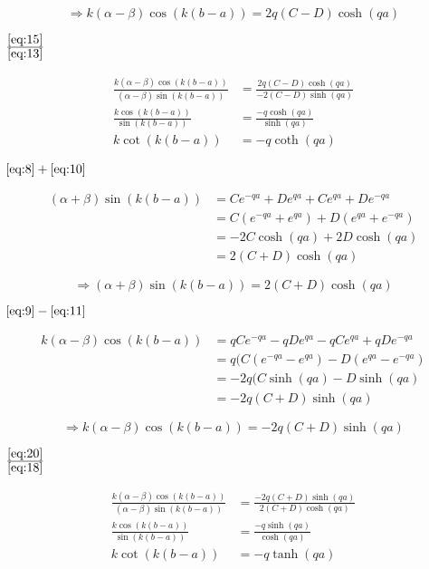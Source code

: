 \begin{equation}
  \label{eq:15}
 \Rightarrow  k(\alpha-\beta)\cos(k(b-a))=2q(C-D)\cosh(qa)
\end{equation}


\( \frac{\eqref{eq:15}}{ \eqref{eq:13} } \)

\begin{align}
  \label{eq:16}
\frac{k(\alpha-\beta)\cos(k(b-a))}{(\alpha-\beta)\sin(k(b-a)) }&=  \frac{2q(C-D)\cosh(qa)}{-2(C-D)\sinh(qa) }\\
\frac{k\cos(k(b-a))}{\sin(k(b-a)) }&=  \frac{-q\cosh(qa)}{\sinh(qa) }\\
k\cot(k(b-a)) &= - q\coth(qa)
\end{align}


\( \eqref{eq:8}+\eqref{eq:10}  \)

\begin{align}
  \label{eq:17}
  (\alpha+\beta)\sin(k(b-a)) &= Ce^{-qa}+De^{qa}+ Ce^{qa}+De^{-qa}\\
&= C(e^{-qa}+ e^{qa})+D(e^{qa}+e^{-qa})\\
&=-2C\cosh(qa)+2D\cosh(qa)\\
&=2(C+D)\cosh(qa)
\end{align}

\begin{equation}
  \label{eq:18}
 \Rightarrow  (\alpha+\beta)\sin(k(b-a))=2(C+D)\cosh(qa)
\end{equation}

\( \eqref{eq:9}-\eqref{eq:11}  \)

\begin{align}
  \label{eq:19}
  k(\alpha-\beta)\cos(k(b-a)) &= qCe^{-qa}-qDe^{qa}- qCe^{qa}+qDe^{-qa}\\
&= q(C(e^{-qa}- e^{qa})-D(e^{qa}-e^{-qa})\\
&= -2q(C\sinh(qa)-D\sinh(qa)\\
&=-2q(C+D)\sinh(qa)
\end{align}

\begin{equation}
  \label{eq:20}
 \Rightarrow  k(\alpha-\beta)\cos(k(b-a))=-2q(C+D)\sinh(qa)
\end{equation}


\( \frac{\eqref{eq:20}}{ \eqref{eq:18} } \)

\begin{align}
  \label{eq:21}
\frac{k(\alpha-\beta)\cos(k(b-a))}{(\alpha-\beta)\sin(k(b-a)) }&=  \frac{-2q(C+D)\sinh(qa)}{2(C+D)\cosh(qa) }\\
\frac{k\cos(k(b-a))}{\sin(k(b-a)) }&= \frac{-q\sinh(qa)}{\cosh(qa) }\\
k\cot(k(b-a)) &= -q \tanh(qa)
\end{align}


